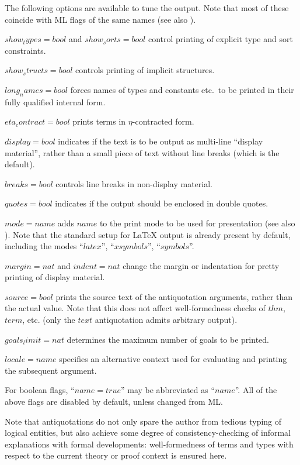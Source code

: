 \medskip

The following options are available to tune the output.  Note that most of
these coincide with ML flags of the same names (see also \cite{isabelle-ref}).
\begin{descr}
\item[$show_types = bool$ and $show_sorts = bool$] control printing of
  explicit type and sort constraints.
\item[$show_structs = bool$] controls printing of implicit structures.
\item[$long_names = bool$] forces names of types and constants etc.\ to be
  printed in their fully qualified internal form.
\item[$eta_contract = bool$] prints terms in $\eta$-contracted form.
\item[$display = bool$] indicates if the text is to be output as multi-line
  ``display material'', rather than a small piece of text without line breaks
  (which is the default).
\item[$breaks = bool$] controls line breaks in non-display material.
\item[$quotes = bool$] indicates if the output should be enclosed in double
  quotes.
\item[$mode = name$] adds $name$ to the print mode to be used for presentation
  (see also \cite{isabelle-ref}).  Note that the standard setup for {\LaTeX}
  output is already present by default, including the modes ``$latex$'',
  ``$xsymbols$'', ``$symbols$''.
\item[$margin = nat$ and $indent = nat$] change the margin or indentation for
  pretty printing of display material.
\item[$source = bool$] prints the source text of the antiquotation arguments,
  rather than the actual value.  Note that this does not affect
  well-formedness checks of $thm$, $term$, etc. (only the $text$ antiquotation
  admits arbitrary output).
\item[$goals_limit = nat$] determines the maximum number of goals to be
  printed.
\item[$locale = name$] specifies an alternative context used for evaluating
  and printing the subsequent argument.
\end{descr}

For boolean flags, ``$name = true$'' may be abbreviated as ``$name$''.  All of
the above flags are disabled by default, unless changed from ML.

\medskip Note that antiquotations do not only spare the author from tedious
typing of logical entities, but also achieve some degree of
consistency-checking of informal explanations with formal developments:
well-formedness of terms and types with respect to the current theory or proof
context is ensured here.

